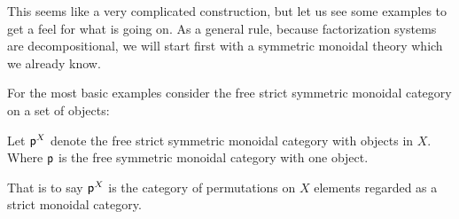 This seems like a very complicated construction, but let us see some examples to get a feel for what is going on.  As a general rule, because factorization systems are decompositional, we will start first with a symmetric monoidal theory which we already know.

For the most basic examples consider the free strict symmetric monoidal category on a set of objects:

\begin{definition}
Let $\P^X$ denote the free strict symmetric monoidal category with objects in $X$. Where $\P$ is the free symmetric monoidal category with one object.

That is to say $\P^X$ is the category of permutations on $X$ elements regarded as a strict monoidal category.
\end{definition}
%
%


